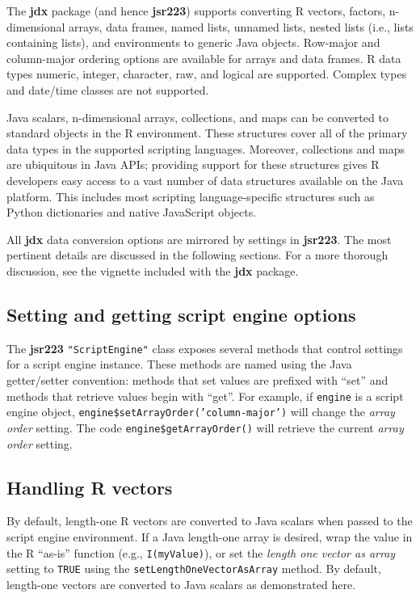 \documentclass[
article,
11pt, %
a4paper, %
oneside, %
headinclude,footinclude, %
]{scrartcl}
\theoremstyle{definition} %
\theoremstyle{plain} %
\theoremstyle{remark} %
\newcommand{\pkg}[1]{\textbf{#1}}
\newcommand{\code}[1]{\texttt{#1}}
\begin{document}
The \pkg{jdx} package (and hence \pkg{jsr223}) supports converting R vectors, factors, n-dimensional arrays, data frames, named lists, unnamed lists, nested lists (i.e., lists containing lists), and environments to generic Java objects. Row-major and column-major ordering options are available for arrays and data frames. R data types numeric, integer, character, raw, and logical are supported. Complex types and date/time classes are not supported.

Java scalars, n-dimensional arrays, collections, and maps can be converted to standard objects in the R environment. These structures cover all of the primary data types in the supported scripting languages. Moreover, collections and maps are ubiquitous in Java APIs; providing support for these structures gives R developers easy access to a vast number of data structures available on the Java platform. This includes most scripting language-specific structures such as Python dictionaries and native JavaScript objects.

All \pkg{jdx} data conversion options are mirrored by settings in \pkg{jsr223}. The most pertinent details are discussed in the following sections. For a more thorough discussion, see the vignette included with the \pkg{jdx} package.

\subsection{Setting and getting script engine options}

The \pkg{jsr223} \code{"ScriptEngine"} class exposes several methods that control settings for a script engine instance. These methods are named using the Java getter/setter convention: methods that set values are prefixed with ``set'' and methods that retrieve values begin with ``get''. For example, if \code{engine} is a script engine object, \code{engine\$setArrayOrder('column-major')} will change the \textit{array order} setting. The code \code{engine\$getArrayOrder()} will retrieve the current \textit{array order} setting.

\hypertarget{handling-r-vectors}{}
\subsection{Handling R vectors}

By default, length-one R vectors are converted to Java scalars when passed to the script engine environment. If a Java length-one array is desired, wrap the value in the R ``as-is'' function (e.g., \code{I(myValue)}), or set the \textit{length one vector as array} setting to \code{TRUE} using the \code{setLengthOneVectorAsArray} method. By default, length-one vectors are converted to Java scalars as demonstrated here.
\end{document}
